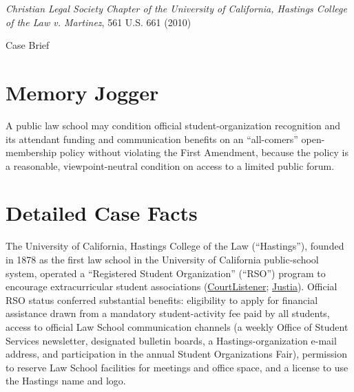 \documentclass[12pt]{article}
\begin{document}
\begin{center}
{\LARGE \textit{Christian Legal Society Chapter of the University of California, Hastings College of the Law v. Martinez}, 561 U.S. 661 (2010)\par}
\vspace{0.8em}
{\large Case Brief\par}
\end{center}
\vspace{1em}

\section{Memory Jogger}

A public law school may condition official student-organization recognition and its attendant funding and communication benefits on an ``all-comers'' open-membership policy without violating the First Amendment, because the policy is a reasonable, viewpoint-neutral condition on access to a limited public forum.

\section{Detailed Case Facts}

The University of California, Hastings College of the Law (``Hastings''), founded in 1878 as the first law school in the University of California public-school system, operated a ``Registered Student Organization'' (``RSO'') program to encourage extracurricular student associations (\href{https://www.courtlistener.com/opinion/150544/christian-legal-soc-chapter-of-univ-of-cal-hastings-college-of-law-v/}{CourtListener}; \href{https://supreme.justia.com/cases/federal/us/561/661/}{Justia}). Official RSO status conferred substantial benefits: eligibility to apply for financial assistance drawn from a mandatory student-activity fee paid by all students, access to official Law School communication channels (a weekly Office of Student Services newsletter, designated bulletin boards, a Hastings-organization e-mail address, and participation in the annual Student Organizations Fair), permission to reserve Law School facilities for meetings and office space, and a license to use the Hastings name and logo.
\end{document}
